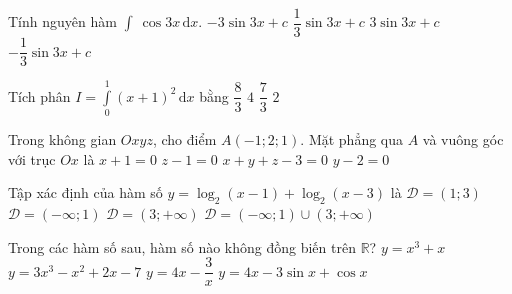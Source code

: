 \begin{ex}%
Tính nguyên hàm $\displaystyle\int\ \cos 3x\mathrm{\,d}x$.
\choice
{$- 3\sin 3x + c$}
{\True $\dfrac{1}{3}\sin 3x + c$}
{$3\sin 3x + c$}
{$- \dfrac{1}{3}\sin 3x + c$}
\end{ex}
\begin{ex}%
Tích phân $I = \displaystyle\int\limits_0^1 \left(x + 1\right)^2\mathrm{\,d}x$ bằng
\choice
{$\dfrac{8}{3}$}
{$4$}
{\True $\dfrac{7}{3}$}
{$2$}
\end{ex}
\begin{ex}%
Trong không gian $Oxyz$, cho điểm $A\left(-1;2;1\right)$. Mặt phẳng qua $A$ và vuông góc với trục $Ox$ là
\choice
{\True $x + 1 = 0$}
{$z - 1 = 0$}
{$x + y + z - 3 = 0$}
{$y - 2 = 0$}
\end{ex}
\begin{ex}%
Tập xác định của hàm số $y = \log_2 \left(x - 1\right) + \log_2 \left(x - 3\right)$ là
\choice
{$\mathscr{D} = \left(1;3\right)$}
{$\mathscr{D} = \left(- \infty;1\right)$}
{\True $\mathscr{D} = \left(3;+\infty\right)$}
{$\mathscr{D} = \left(- \infty;1\right) \cup \left(3;+\infty\right)$}
\end{ex}
\begin{ex}%
Trong các hàm số sau, hàm số nào không đồng biến trên $\mathbb{R}$?
\choice
{$y = x^3 + x$}
{$y = 3x^3 - x^2 + 2x - 7$}
{\True $y = 4x - \dfrac{3}{x}$}
{$y = 4x - 3\sin x + \cos x$}
\end{ex}
